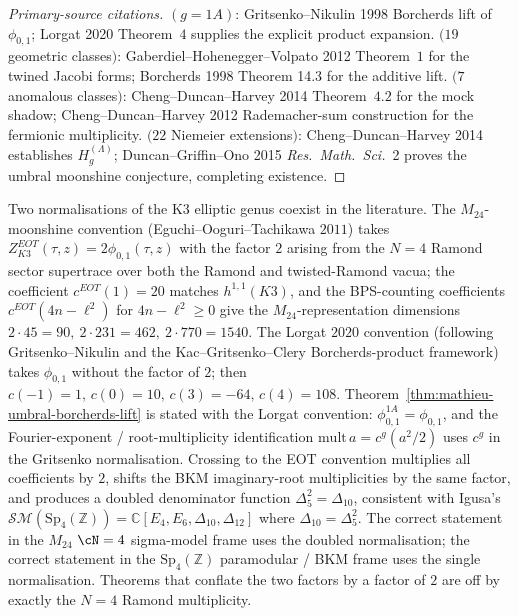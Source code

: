 \begin{proof}[Primary-source citations]
$(g = 1A)$: Gritsenko--Nikulin 1998 Borcherds lift of $\phi_{0,1}$;
Lorgat 2020 Theorem~$4$ supplies the explicit product expansion.
$(19$ geometric classes$)$: Gaberdiel--Hohenegger--Volpato 2012 Theorem~$1$
for the twined Jacobi forms; Borcherds 1998 Theorem 14.3 for the additive
lift. $(7$ anomalous classes$)$: Cheng--Duncan--Harvey 2014 Theorem~$4.2$
for the mock shadow; Cheng--Duncan--Harvey 2012 Rademacher-sum construction
for the fermionic multiplicity. $(22$ Niemeier extensions$)$:
Cheng--Duncan--Harvey 2014 establishes $H^{(\Lambda)}_g$;
Duncan--Griffin--Ono 2015 \emph{Res.~Math.~Sci.}~2 proves the umbral
moonshine conjecture, completing existence.
\end{proof}

\begin{remark}
\label{rem:mathieu-eot-factor-2-bridge}
Two normalisations of the K3 elliptic genus coexist in the
literature. The $M_{24}$-moonshine convention
\textup{(}Eguchi--Ooguri--Tachikawa $2011$\textup{)} takes
$Z^{EOT}_{K3}(\tau,z) = 2\phi_{0,1}(\tau,z)$ with the factor $2$
arising from the $N = 4$ Ramond sector supertrace over both the
Ramond and twisted-Ramond vacua; the coefficient $c^{EOT}(1) = 20$
matches $h^{1,1}(K3)$, and the BPS-counting coefficients
$c^{EOT}(4n - \ell^2)$ for $4n - \ell^2 \geq 0$ give the
$M_{24}$-representation dimensions $2\cdot 45 = 90,\ 2\cdot 231 =
462,\ 2\cdot 770 = 1540$. The Lorgat $2020$ convention
\textup{(}following Gritsenko--Nikulin and the Kac--Gritsenko--Clery
Borcherds-product framework\textup{)} takes $\phi_{0,1}$ without the
factor of $2$; then $c(-1) = 1,\,c(0) = 10,\,c(3) = -64,\,c(4) = 108$.
Theorem~\ref{thm:mathieu-umbral-borcherds-lift} is stated with the
Lorgat convention: $\phi^{1A}_{0,1} = \phi_{0,1}$, and the
Fourier-exponent / root-multiplicity identification
$\mathrm{mult}\,a = c^g(a^2/2)$ uses $c^g$ in the Gritsenko
normalisation. Crossing to the EOT convention multiplies all
coefficients by $2$, shifts the BKM imaginary-root multiplicities by
the same factor, and produces a doubled denominator function
$\Delta_5^2 = \Delta_{10}$, consistent with Igusa's
$\mathcal{SM}(\mathrm{Sp}_4(\mathbb Z)) = \mathbb C[E_4, E_6,
\Delta_{10}, \Delta_{12}]$ where $\Delta_{10} = \Delta_5^2$. The
correct statement in the $M_{24}$ $\cN = 4$ sigma-model frame uses
the doubled normalisation; the correct statement in the
$\mathrm{Sp}_4(\mathbb Z)$ paramodular / BKM frame uses the single
normalisation. Theorems that conflate the two factors by a factor of
$2$ are off by exactly the $N = 4$ Ramond multiplicity.
\end{remark}


